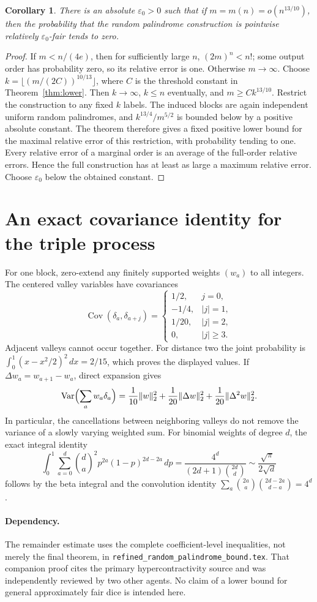 \documentclass[11pt]{article}
\newtheorem{corollary}[theorem]{Corollary}
\newcommand{\Var}{\operatorname{Var}}
\begin{document}
\begin{corollary}\label{cor:threshold}
There is an absolute $\varepsilon_0>0$ such that if
$m=m(n)=o(n^{13/10})$, then the probability that the random palindrome
construction is pointwise relatively $\varepsilon_0$-fair tends to zero.
\end{corollary}
\begin{proof}
If $m<n/(4e)$, then for sufficiently large $n$, $(2m)^n<n!$; some output
order has probability zero, so its relative error is one.
Otherwise $m\to\infty$. Choose
$k=\lfloor(m/(2C))^{10/13}\rfloor$, where $C$ is the threshold constant
in Theorem~\ref{thm:lower}. Then $k\to\infty$, $k\leq n$ eventually, and
$m\geq Ck^{13/10}$. Restrict the construction to any fixed $k$ labels.
The induced blocks are again independent uniform random palindromes,
and $k^{13/4}/m^{5/2}$ is bounded below by a positive absolute constant.
The theorem therefore gives a fixed positive lower bound for the maximal
relative error of this restriction, with probability tending to one.
Every relative error of a marginal order is an average of the full-order
relative errors. Hence the full construction has at least as large a
maximum relative error. Choose $\varepsilon_0$ below the obtained constant.
\end{proof}

\section{An exact covariance identity for the triple process}
For one block, zero-extend any finitely supported weights $(w_a)$ to all
integers. The centered valley variables have covariances
\[
 \operatorname{Cov}(\delta_a,\delta_{a+j})=
 \begin{cases}1/2,&j=0,\\-1/4,&|j|=1,\\1/20,&|j|=2,\\0,&|j|\geq3.\end{cases}
\]
Adjacent valleys cannot occur together. For distance two the joint
probability is
$\int_0^1(x-x^2/2)^2\,dx=2/15$, which proves the displayed values.
If $\Delta w_a=w_{a+1}-w_a$, direct expansion gives
\[
 \Var\Bigl(\sum_aw_a\delta_a\Bigr)
 =\frac1{10}\|w\|_2^2+\frac1{20}\|\Delta w\|_2^2
                  +\frac1{20}\|\Delta^2w\|_2^2.
\]
In particular, the cancellations between neighboring valleys do not remove
the variance of a slowly varying weighted sum.
For binomial weights of degree $d$, the exact integral identity
\[
 \int_0^1\sum_{a=0}^d\binom da^2p^{2a}(1-p)^{2d-2a}\,dp
 =\frac{4^d}{(2d+1)\binom{2d}d}
 \sim\frac{\sqrt\pi}{2\sqrt d}
\]
follows by the beta integral and the convolution identity
$\sum_a\binom{2a}a\binom{2d-2a}{d-a}=4^d$.

\paragraph{Dependency.}
The remainder estimate uses the complete coefficient-level inequalities,
not merely the final theorem, in
\texttt{refined\_random\_palindrome\_bound.tex}. That companion proof cites
the primary hypercontractivity source and was independently reviewed by
two other agents. No claim of a lower bound for general approximately fair
dice is intended here.
\end{document}
